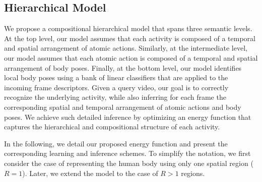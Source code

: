 \subsection{Hierarchical Model}
\begin{comment}
As discussed in Section \ref{sec:related_work}, some work on composed actions \cite{Koppula2012,Wei2013} extract descriptors from temporal segments over the entire video.
This setup does not allow to get annotated data in every frame as output of the model.
To use descriptors based on frames, as our model does, one alternative during learning is to construct several action classifiers, based on the descriptors of frames belonging to that single action, and for classification, try to estimate the initial and end frames of every action using a heuristic approach.
To get the activity label, one alternative is to count the present actions in the video to fed an activity classifier, in a bottom-up approach.
Other alternative is to construct complex activity classifiers fed directly with the descriptors of the frames, losing the activity/action relations.
Clearly, a more clever way is to jointly construct activity and atomic action classifiers, using just one classifier for each atomic action in the whole training set, and then use aggregated information of the frames belonging to each atomic action to feed the activity classifiers.
\end{comment}

We propose a compositional hierarchical model that spans three semantic levels. At the top level, 
our model assumes that each activity is composed of a temporal and spatial arrangement of atomic 
actions. Similarly, at the intermediate level, our model assumes that each atomic action is composed 
of a temporal and spatial arrangement of body poses. Finally, at the bottom level, our model 
identifies local body poses using a bank of linear classifiers that are applied to the incoming 
frame descriptors. Given a query video, our goal is to correctly recognize the underlying activity, 
while also inferring for each frame the corresponding spatial and temporal arrangement of atomic 
actions and body poses. We achieve such detailed inference by optimizing an energy function that 
captures the hierarchical and compositional structure of each activity. 

In the following, we detail our proposed energy function and present the corresponding learning and 
inference schemes. To simplify the notation, we first consider the case of representing the 
human body using only one spatial region ($R=1$). Later, we extend the model to the case of $R > 1$ 
regions.

